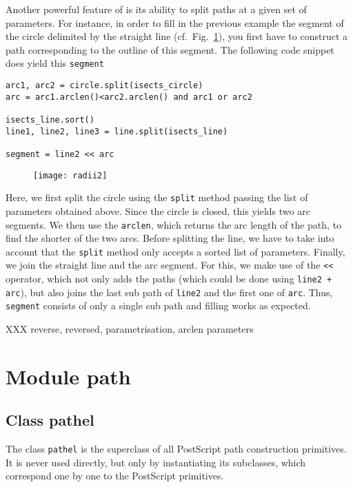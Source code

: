 Another powerful feature of \PyX{} is its ability to split paths at a
given set of parameters. For instance, in order to fill in the
previous example the segment of the circle delimited by the straight
line (cf.\ Fig.~\ref{fig:radii2}), you first have to construct a path
corresponding to the outline of this segment. The following code
snippet does yield this \verb|segment|
\begin{verbatim}
arc1, arc2 = circle.split(isects_circle)
arc = arc1.arclen()<arc2.arclen() and arc1 or arc2

isects_line.sort()
line1, line2, line3 = line.split(isects_line)

segment = line2 << arc
\end{verbatim}
\begin{figure}
\centerline{\texttt{[image: radii2]}}
\label{fig:radii2}
\end{figure}
Here, we first split the circle using the \verb|split| method passing
the list of parameters obtained above. Since the circle is closed,
this yields two arc segments. We then use the \verb|arclen|, which
returns the arc length of the path, to find the shorter of the two
arcs. Before splitting the line, we have to take into account that
the \verb|split| method only accepts a sorted list of parameters.
Finally, we join the straight line and the arc segment. For
this, we make use of the \verb|<<| operator, which not only adds
the paths (which could be done using \verb|line2 + arc|), but also
joins the last sub path of \verb|line2| and the first one of
\verb|arc|. Thus, \verb|segment| consists of only a single sub path
and filling works as expected.

XXX reverse, reversed, parametrisation, arclen parameters


\section{Module path}

\subsection{Class pathel}

The class \verb|pathel| is the superclass of all PostScript path
construction primitives. It is never used directly, but only by
instantiating its subclasses, which correspond one by one to the
PostScript primitives.

